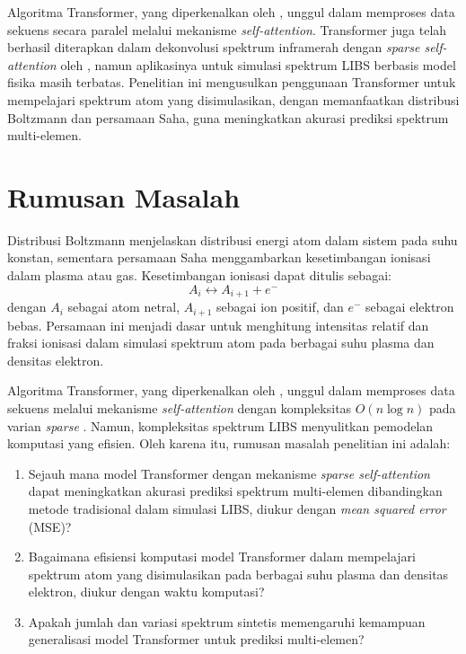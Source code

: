 \par Algoritma Transformer, yang diperkenalkan oleh \cite{vaswani-2017}, unggul dalam memproses data sekuens secara paralel melalui mekanisme \textit{self-attention}. Transformer juga telah berhasil diterapkan dalam dekonvolusi spektrum inframerah dengan \textit{sparse self-attention} oleh \cite{gao2024}, namun aplikasinya untuk simulasi spektrum LIBS berbasis model fisika masih terbatas. Penelitian ini mengusulkan penggunaan Transformer untuk mempelajari spektrum atom yang disimulasikan, dengan memanfaatkan distribusi Boltzmann dan persamaan Saha, guna meningkatkan akurasi prediksi spektrum multi-elemen.


\section{Rumusan Masalah}
Distribusi Boltzmann menjelaskan distribusi energi atom dalam sistem pada suhu konstan, sementara persamaan Saha menggambarkan kesetimbangan ionisasi dalam plasma atau gas. Kesetimbangan ionisasi dapat ditulis sebagai:
\begin{equation}
A_i \leftrightarrow A_{i+1} + e^-
\end{equation}
dengan \( A_i \) sebagai atom netral, \( A_{i+1} \) sebagai ion positif, dan \( e^- \) sebagai elektron bebas. Persamaan ini menjadi dasar untuk menghitung intensitas relatif dan fraksi ionisasi dalam simulasi spektrum atom pada berbagai suhu plasma dan densitas elektron.

Algoritma Transformer, yang diperkenalkan oleh \cite{vaswani-2017}, unggul dalam memproses data sekuens melalui mekanisme \textit{self-attention} dengan kompleksitas \( O(n \log n) \) pada varian \textit{sparse} \parencite{gao2024}. Namun, kompleksitas spektrum LIBS menyulitkan pemodelan komputasi yang efisien. Oleh karena itu, rumusan masalah penelitian ini adalah:
\begin{enumerate}
    \item Sejauh mana model Transformer dengan mekanisme \textit{sparse self-attention} dapat meningkatkan akurasi prediksi spektrum multi-elemen dibandingkan metode tradisional dalam simulasi LIBS, diukur dengan \textit{mean squared error} (MSE)?
    \item Bagaimana efisiensi komputasi model Transformer dalam mempelajari spektrum atom yang disimulasikan pada berbagai suhu plasma dan densitas elektron, diukur dengan waktu komputasi?
    \item Apakah jumlah dan variasi spektrum sintetis memengaruhi kemampuan generalisasi model Transformer untuk prediksi multi-elemen?
\end{enumerate}


